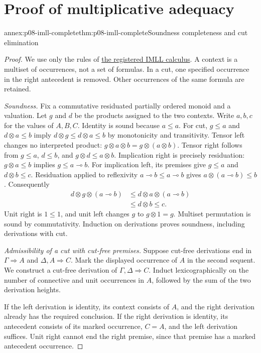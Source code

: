 \section{Proof of multiplicative adequacy}
\label{sec:annex-p08-imll-complete}

\begin{annexitem}{annex:p08-imll-complete}{thm:p08-imll-complete}{Soundness completeness and cut elimination}
\begin{proof}
We use only the rules of \hyperref[sheet:imll]{the registered IMLL calculus}. A context is a multiset
of occurrences, not a set of formulas. In a cut, one specified occurrence
in the right antecedent is removed. Other occurrences of the same
formula are retained.

\emph{Soundness.}
Fix a commutative residuated partially ordered monoid and a valuation.
Let \(g\) and \(d\) be the products assigned to the two contexts.
Write \(a,b,c\) for the values of \(A,B,C\).
Identity is sound because \(a\leq a\).
For cut, \(g\leq a\) and \(d\otimes a\leq b\) imply
\(d\otimes g\leq d\otimes a\leq b\) by monotonicity and transitivity.
Tensor left changes no interpreted product:
\(g\otimes a\otimes b=g\otimes(a\otimes b)\).
Tensor right follows from
\(g\leq a\), \(d\leq b\), and
\(g\otimes d\leq a\otimes b\).
Implication right is precisely residuation:
\(g\otimes a\leq b\) implies \(g\leq a\multimap b\).
For implication left, its premises give \(g\leq a\) and
\(d\otimes b\leq c\).
Residuation applied to reflexivity
\(a\multimap b\leq a\multimap b\) gives
\(a\otimes(a\multimap b)\leq b\).
Consequently
\[
 \begin{aligned}
 d\otimes g\otimes(a\multimap b)
 &\leq d\otimes a\otimes(a\multimap b)\\
 &\leq d\otimes b\leq c.
 \end{aligned}
\]
Unit right is \(1\leq1\), and unit left changes \(g\) to
\(g\otimes1=g\). Multiset permutation is sound by commutativity.
Induction on derivations proves soundness, including derivations with cut.

\emph{Admissibility of a cut with cut-free premises.}
Suppose cut-free derivations end in
\(\Gamma\Rightarrow A\) and \(\Delta,A\Rightarrow C\).
Mark the displayed occurrence of \(A\) in the second sequent.
We construct a cut-free derivation of \(\Gamma,\Delta\Rightarrow C\).
Induct lexicographically on the number of connective and unit occurrences
in \(A\), followed by the sum of the two derivation heights.

If the left derivation is identity, its context consists of \(A\),
and the right derivation already has the required conclusion.
If the right derivation is identity, its antecedent consists of its
marked occurrence, \(C=A\), and the left derivation suffices.
Unit right cannot end the right premise, since that premise has a
marked antecedent occurrence.


\end{proof}
\end{annexitem}
